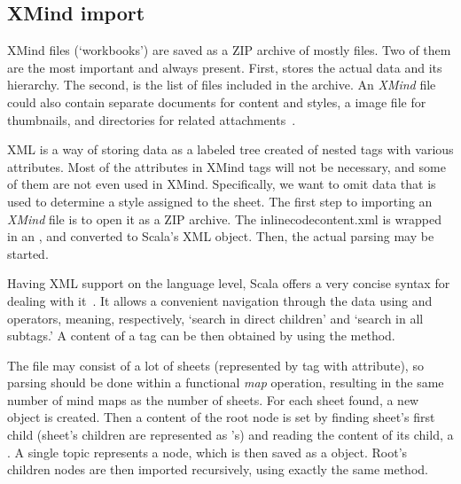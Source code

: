 %
%
%
%
%

\subsection{XMind import}
\label{subsec:xmind-exchange}

XMind files (`workbooks') are saved as a ZIP archive of mostly  files. Two of them are the most important and always present. First,  stores the actual data and its hierarchy. The second,  is the list of files included in the archive. An {\em XMind} file could also contain separate  documents for content and styles, a  image file for thumbnails, and directories for related attachments~\cite{XMind:2009:Format}.

XML is a way of storing data as a labeled tree created of nested tags with various attributes. Most of the attributes in  XMind tags will not be necessary, and some of them are not even used in XMind. Specifically, we want to omit data that is used to determine a style assigned to the sheet. The first step to importing an {\em XMind} file is to open it as a ZIP archive. The inlinecode{content.xml} is wrapped in an , and converted to Scala's XML object. Then, the actual parsing may be started.

Having XML support on the language level, Scala offers a very concise syntax for dealing with it~\cite{Odersky:2008:Programming}. It allows a convenient navigation through the data using \inlinecode{\textbackslash} and \inlinecode{\textbackslash\textbackslash} operators, meaning, respectively, `search in direct children' and `search in all subtags.' A content of a tag can be then obtained by using the  method.

The  file may consist of a lot of sheets (represented by  tag with  attribute), so parsing should be done within a functional \emph{map} operation, resulting in the same number of mind maps as the number of sheets. For each sheet found, a new  object is created. Then a content of the root node is set by finding sheet's first child (sheet's children are represented as 's) and reading the content of its child, a . A single topic represents a node, which is then saved as a  object. Root's children nodes are then imported recursively, using exactly the same method.
